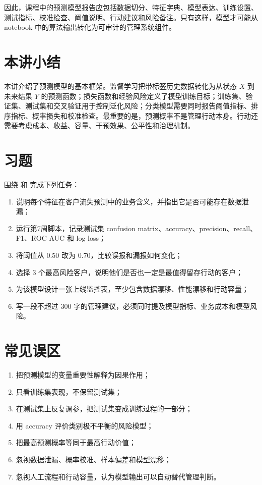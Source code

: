 \documentclass[UTF8,fontset=fandol,openany,zihao=-4]{ctexbook}
\begin{document}
因此，课程中的预测模型报告应包括数据切分、特征字典、模型表达、训练设置、测试指标、校准检查、阈值说明、行动建议和风险备注。只有这样，模型才可能从 notebook 中的算法输出转化为可审计的管理系统组件。

\section*{本讲小结}

本讲介绍了预测模型的基本框架。监督学习把带标签历史数据转化为从状态 \(X\) 到未来结果 \(Y\) 的预测函数；损失函数和经验风险定义了模型训练目标；训练集、验证集、测试集和交叉验证用于控制泛化风险；分类模型需要同时报告阈值指标、排序指标、概率损失和校准检查。最重要的是，预测概率不是管理行动本身。行动还需要考虑成本、收益、容量、干预效果、公平性和治理机制。

\section*{习题}

\begin{exercise}
围绕  和  完成下列任务：
\begin{enumerate}
  \item 说明每个特征在客户流失预测中的业务含义，并指出它是否可能存在数据泄漏；
  \item 运行第7周脚本，记录测试集 confusion matrix、accuracy、precision、recall、F1、ROC AUC 和 log loss；
  \item 将阈值从 0.50 改为 0.70，比较误报和漏报如何变化；
  \item 选择 3 个最高风险客户，说明他们是否也一定是最值得留存行动的客户；
  \item 为该模型设计一张上线监控表，至少包含数据漂移、性能漂移和行动容量；
  \item 写一段不超过 300 字的管理建议，必须同时提及模型指标、业务成本和模型风险。
\end{enumerate}
\end{exercise}

\section*{常见误区}

\begin{enumerate}
  \item 把预测模型的变量重要性解释为因果作用；
  \item 只看训练集表现，不保留测试集；
  \item 在测试集上反复调参，把测试集变成训练过程的一部分；
  \item 用 accuracy 评价类别极不平衡的风险模型；
  \item 把最高预测概率等同于最高行动价值；
  \item 忽视数据泄漏、概率校准、样本偏差和模型漂移；
  \item 忽视人工流程和行动容量，认为模型输出可以自动替代管理判断。
\end{enumerate}
\end{document}
